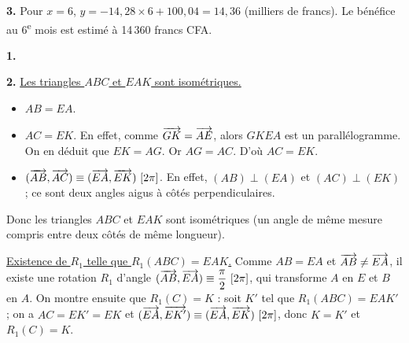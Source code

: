 \documentclass[11pt]{article}
\begin{document}
\textbf{3.} Pour $x = 6$, $y = -14{,}28 \times 6 + 100{,}04 = 14{,}36$ (milliers de francs). Le bénéfice au 6\textsuperscript{e} mois est estimé à 14\,360 francs CFA.

\prob{}

\textbf{1.} \begin{center}
\end{center}

\textbf{2.} \underline{Les triangles $ABC$ et $EAK$ sont isométriques.}
\begin{itemize}
  \item $AB = EA$.
  \item $AC = EK$. En effet, comme $\overrightarrow{GK} = \overrightarrow{AE}$, alors $GKEA$ est un parallélogramme. On en déduit que $EK = AG$. Or $AG = AC$. D'où $AC = EK$.
  \item $(\overrightarrow{AB}, \overrightarrow{AC}) \equiv (\overrightarrow{EA}, \overrightarrow{EK})\ [2\pi]$. En effet, $(AB) \perp (EA)$ et $(AC) \perp (EK)$ ; ce sont deux angles aigus à côtés perpendiculaires.
\end{itemize}
Donc les triangles $ABC$ et $EAK$ sont isométriques (un angle de même mesure compris entre deux côtés de même longueur).

\underline{Existence de $R_1$ telle que $R_1(ABC) = EAK$.} Comme $AB = EA$ et $\overrightarrow{AB} \ne \overrightarrow{EA}$, il existe une rotation $R_1$ d'angle $(\overrightarrow{AB}, \overrightarrow{EA}) \equiv \dfrac{\pi}{2}\ [2\pi]$, qui transforme $A$ en $E$ et $B$ en $A$. On montre ensuite que $R_1(C) = K$ : soit $K'$ tel que $R_1(ABC) = EAK'$ ; on a $AC = EK' = EK$ et $(\overrightarrow{EA}, \overrightarrow{EK'}) \equiv (\overrightarrow{EA}, \overrightarrow{EK})\ [2\pi]$, donc $K = K'$ et $R_1(C) = K$.
\end{document}
